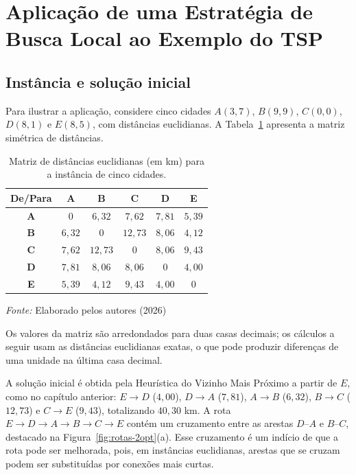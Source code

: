 \section{Aplicação de uma Estratégia de Busca Local ao Exemplo do TSP}

\subsection{Instância e solução inicial}

Para ilustrar a aplicação, considere cinco cidades $A(3,7)$, $B(9,9)$, $C(0,0)$, $D(8,1)$ e $E(8,5)$, com distâncias euclidianas. A Tabela~\ref{tab:distancias-5cidades} apresenta a matriz simétrica de distâncias.

\begin{table}[htb]
\centering
\caption{\label{tab:distancias-5cidades}Matriz de distâncias euclidianas (em km) para a instância de cinco cidades.}
\renewcommand{\arraystretch}{1.2}
\begin{tabular}{|c|c|c|c|c|c|}
\hline
\rowcolor{gray!20}
\textbf{De/Para} & \textbf{A} & \textbf{B} & \textbf{C} & \textbf{D} & \textbf{E} \\ \hline
\textbf{A} & $0$ & $6{,}32$ & $7{,}62$ & $7{,}81$ & $5{,}39$ \\ \hline
\textbf{B} & $6{,}32$ & $0$ & $12{,}73$ & $8{,}06$ & $4{,}12$ \\ \hline
\textbf{C} & $7{,}62$ & $12{,}73$ & $0$ & $8{,}06$ & $9{,}43$ \\ \hline
\textbf{D} & $7{,}81$ & $8{,}06$ & $8{,}06$ & $0$ & $4{,}00$ \\ \hline
\textbf{E} & $5{,}39$ & $4{,}12$ & $9{,}43$ & $4{,}00$ & $0$ \\ \hline
\end{tabular}

\footnotesize{\textit{Fonte:} Elaborado pelos autores (2026)}
\end{table}

Os valores da matriz são arredondados para duas casas decimais; os cálculos a seguir usam as distâncias euclidianas exatas, o que pode produzir diferenças de uma unidade na última casa decimal.

A solução inicial é obtida pela Heurística do Vizinho Mais Próximo a partir de $E$, como no capítulo anterior: $E \rightarrow D$ ($4{,}00$), $D \rightarrow A$ ($7{,}81$), $A \rightarrow B$ ($6{,}32$), $B \rightarrow C$ ($12{,}73$) e $C \rightarrow E$ ($9{,}43$), totalizando $40{,}30$ km. A rota $E \rightarrow D \rightarrow A \rightarrow B \rightarrow C \rightarrow E$ contém um cruzamento entre as arestas $D$--$A$ e $B$--$C$, destacado na Figura~\ref{fig:rotas-2opt}(a). Esse cruzamento é um indício de que a rota pode ser melhorada, pois, em instâncias euclidianas, arestas que se cruzam podem ser substituídas por conexões mais curtas.

